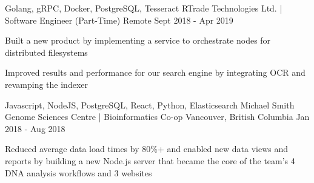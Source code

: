 \begin{cventries}
  \cventry
    {Golang, gRPC, Docker, PostgreSQL, Tesseract} %
    {RTrade Technologies Ltd. | Software Engineer (Part-Time)} %
    {Remote} %
    {Sept 2018 - Apr 2019} %
    {
      \begin{cvitems} %
        \item {Built a new product by implementing a service to orchestrate nodes for distributed filesystems}
        \item {Improved results and performance for our search engine by integrating OCR and revamping the indexer}
      \end{cvitems}
    }

  \cventry
    {Javascript, NodeJS, PostgreSQL, React, Python, Elasticsearch} %
    {Michael Smith Genome Sciences Centre | Bioinformatics Co-op} %
    {Vancouver, British Columbia} %
    {Jan 2018 - Aug 2018} %
    {
      \begin{cvitems} %
        \item {Reduced average data load times by 80\%+ and enabled new data views and reports by building a new Node.js server that became the core of the team’s 4 DNA analysis workflows and 3 websites}
      \end{cvitems}
    }

\end{cventries}
